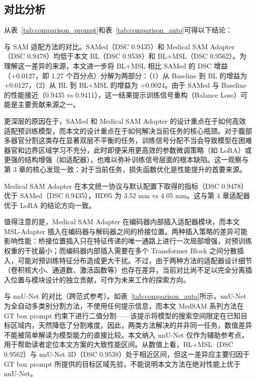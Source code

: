 \subsection{对比分析}

从表~\ref{tab:comparison_prompt}和表~\ref{tab:comparison_auto}可得以下结论：

与 SAM 适配方法的对比。SAMed（DSC 0.9435）和 Medical SAM Adapter（DSC 0.9478）均低于本文 BL（DSC 0.9538）和 BL+MSL（DSC 0.9562）。为理解这一差异的来源，本文进一步将 BL+MSL 相比 SAMed 的 DSC 增益（+0.0127，即 1.27 个百分点）分解为两部分：（1）从 Baseline 到 BL 的增益为 +0.0127，（2）从 BL 到 BL+MSL 的增益为 +0.0024。由于 SAMed 与 Baseline 的性能接近（0.9435 vs 0.9411），这一结果提示训练信号重构（Balance Loss）可能是主要贡献来源之一。

更深层的原因在于，SAMed 和 Medical SAM Adapter 的设计重点在于如何高效适配预训练模型，而本文的设计重点在于如何解决当前任务的核心瓶颈。对于腹部多器官分割这类存在显著双层不平衡的任务，训练信号分配不当会导致模型在困难器官和边界区域学习不充分，此时即便采用更高效的参数微调策略（如 LoRA）或更强的结构增强（如适配器），也难以弥补训练信号层面的根本缺陷。这一观察与第 3 章的核心发现一致：对于当前任务，损失函数优化是性能提升的首要来源。

Medical SAM Adapter 在本文统一协议与默认配置下取得的指标（DSC 0.9478）优于 SAMed（DSC 0.9435），HD95 为 3.52 mm vs 4.05 mm。这与第 4 章适配器优于 LoRA 的结论方向一致。

值得注意的是，Medical SAM Adapter 在编码器内部插入适配器模块，而本文 MSL-Adapter 插入在编码器与解码器之间的桥接位置。两种插入策略的差异可能影响性能：桥接位置插入只在特征传递的唯一通路上进行一次局部增强，对预训练权重的干扰最小；而编码器内部插入需要在多个 Transformer Block 之间分散插入，可能对预训练特征分布造成更大干扰。不过，由于两种方法的适配器设计细节（卷积核大小、通道数、激活函数等）也存在差异，当前对比尚不足以完全分离插入位置与模块设计的独立贡献，可作为未来工作的探索方向。

与 nnU-Net 的对比（跨范式参考）。如表~\ref{tab:comparison_auto}所示，nnU-Net 为全自动多类别分割方法，不使用任何提示信息，而本文 MedSAM 系列方法在 GT box prompt 约束下进行二值分割——该提示将模型的搜索空间限定在已知目标区域内，天然降低了分割难度。因此，两类方法解决的并非同一任务，数值差异不能被简单解读为模型能力的直接比较。本文纳入 nnU-Net 仅作为辅助参考点，用于帮助读者定位本文方案的大致性能区间。从数值上看，BL+MSL（DSC 0.9562）与 nnU-Net 3D（DSC 0.9538）处于相近区间，但这一差异应主要归因于 GT box prompt 所提供的目标区域先验，不能说明本文方法在绝对性能上优于 nnU-Net。

